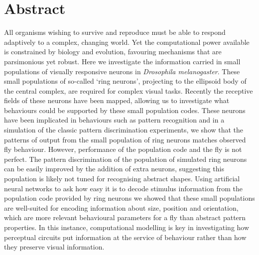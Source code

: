 \section{Abstract}
All organisms wishing to survive and reproduce must be able to respond adaptively to a complex, changing world.
Yet the computational power available is constrained by biology and evolution, favouring mechanisms that are parsimonious yet robust.
Here we investigate the information carried in small populations of visually responsive neurons in \emph{Drosophila melanogaster}.
These small populations of so-called `ring neurons', projecting to the ellipsoid body of the central complex, are required for complex visual tasks.
Recently the receptive fields of these neurons have been mapped, allowing us to investigate what behaviours could be supported by these small population codes. These neurons have been implicated in behaviours such as pattern recognition and in a simulation of the classic pattern discrimination experiments, we show that the patterns of output from the small population of ring neurons matches observed fly behaviour. However, performance of the population code and the fly is not perfect. The pattern discrimination of the population of simulated ring neurons can be easily improved by the addition of extra neurons, suggesting this population is likely not tuned for recognising abstract shapes. Using artificial neural networks to ask how easy it is to decode stimulus information from the population code provided by ring neurons we showed that these small populations are well-suited for encoding information about size, position and orientation, which are more relevant behavioural parameters for a fly than abstract pattern properties. In this instance, computational modelling is key in investigating how perceptual circuits put information at the service of behaviour rather than how they preserve visual information.
